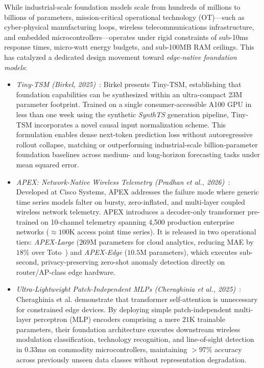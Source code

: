 While industrial-scale foundation models scale from hundreds of millions to billions of parameters, mission-critical operational technology (OT)—such as cyber-physical manufacturing loops, wireless telecommunications infrastructure, and embedded microcontrollers—operates under rigid constraints of sub-10ms response times, micro-watt energy budgets, and sub-100MB RAM ceilings. This has catalyzed a dedicated design movement toward \emph{edge-native foundation models}:
\begin{itemize}[leftmargin=*]
    \item \emph{Tiny-TSM (Birkel, 2025)}~\cite{birkel2025tinytsm}: Birkel presents Tiny-TSM, establishing that foundation capabilities can be synthesized within an ultra-compact 23M parameter footprint. Trained on a single consumer-accessible A100 GPU in less than one week using the synthetic \emph{SynthTS} generation pipeline, Tiny-TSM incorporates a novel causal input normalization scheme. This formulation enables dense next-token prediction loss without autoregressive rollout collapse, matching or outperforming industrial-scale billion-parameter foundation baselines across medium- and long-horizon forecasting tasks under mean squared error.
    \item \emph{APEX: Network-Native Wireless Telemetry (Pradhan et al., 2026)}~\cite{pradhan2026apex}: Developed at Cisco Systems, APEX addresses the failure mode where generic time series models falter on bursty, zero-inflated, and multi-layer coupled wireless network telemetry. APEX introduces a decoder-only transformer pre-trained on 10-channel telemetry spanning 4,500 production enterprise networks ($\approx 100\text{K}$ access point time series). It is released in two operational tiers: \emph{APEX-Large} ($269\text{M}$ parameters for cloud analytics, reducing MAE by $18\%$ over Toto~\cite{datadog2026toto2}) and \emph{APEX-Edge} ($10.5\text{M}$ parameters), which executes sub-second, privacy-preserving zero-shot anomaly detection directly on router/AP-class edge hardware.
    \item \emph{Ultra-Lightweight Patch-Independent MLPs (Cheraghinia et al., 2025)}~\cite{cheraghinia2025lightweight}: Cheraghinia et al. demonstrate that transformer self-attention is unnecessary for constrained edge devices. By deploying simple patch-independent multi-layer perceptron (MLP) encoders comprising a mere $21\text{K}$ trainable parameters, their foundation architecture executes downstream wireless modulation classification, technology recognition, and line-of-sight detection in $0.33\text{ms}$ on commodity microcontrollers, maintaining $>97\%$ accuracy across previously unseen data classes without representation degradation.

\end{itemize}
